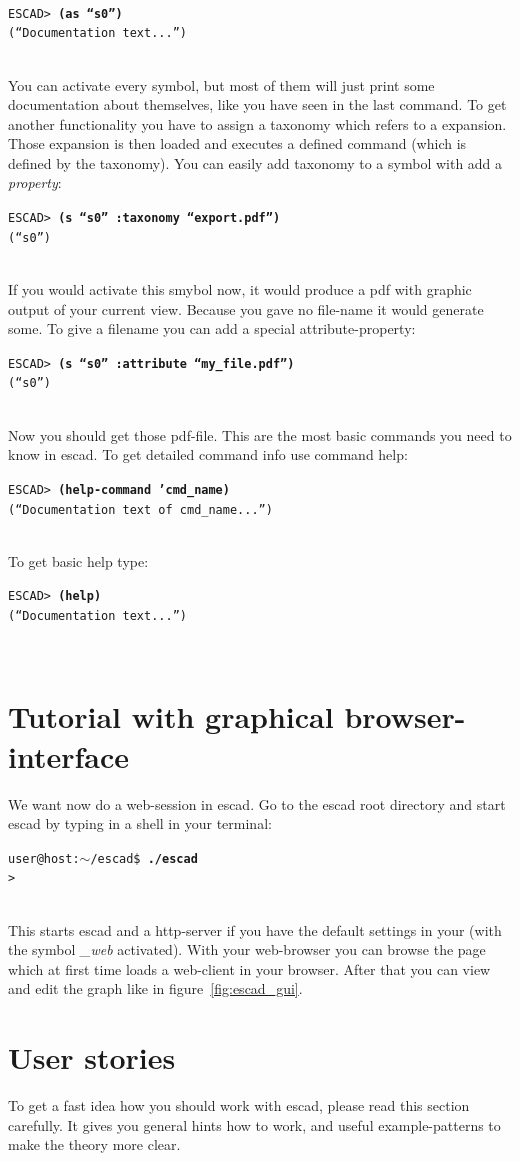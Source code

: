 \documentclass[a4paper, 12pt, openany]{scrbook}
\makeatletter
\newcommand{\shellcmdline}[2]{\\
  \setlength{\fboxsep}{2pt}\colorbox{black!20}{\parbox{\textwidth}{\texttt{user@host:$\sim$/escad\$ \textbf{#1}\\#2}}}\\}
\newcommand{\escadcmdline}[2]{\\\setlength{\fboxsep}{2pt}\colorbox{black!20}{\parbox{\textwidth}{\texttt{ESCAD> \textbf{#1}\\#2}}}\\}
\makeatother
\begin{document}
\escadcmdline{(as ``s0'')}{(``Documentation text...'')}
You can activate every symbol, but most of them will just print some documentation about themselves, like you have seen in the last command. To get another functionality you have to assign a taxonomy which refers to a expansion. Those expansion is then loaded and executes a defined command (which is defined by the taxonomy).
You can easily add taxonomy to a symbol with add a \emph{property}:
\escadcmdline{(s ``s0'' :taxonomy ``export.pdf'')}{(``s0'')}
If you would activate this smybol now, it would produce a pdf with graphic output of your current view. Because you gave no file-name it would generate some. To give a filename you can add a special attribute-property:
\escadcmdline{(s ``s0'' :attribute ``my\_file.pdf'')}{(``s0'')}
Now you should get those pdf-file.
This are the most basic commands you need to know in escad. To get detailed command info use command help:
\escadcmdline{(help-command 'cmd\_name)}{(``Documentation text of cmd\_name...'')}
To get basic help type:
\escadcmdline{(help)}{(``Documentation text...'')}
\section{Tutorial with graphical browser-interface}
We want now do a web-session in escad. Go to the escad root directory and start escad by typing in a shell in your terminal:
\shellcmdline{./escad}{>}
This starts escad and a http-server if you have the default settings in your  (with the symbol \emph{\_web} activated). With your web-browser you can browse the page which at first time loads a web-client in your browser. After that you can view and edit the graph like in figure~\ref{fig:escad_gui}.
\section{User stories}
To get a fast idea how you should work with escad, please read this section carefully. It gives you general hints how to work, and useful example-patterns to make the theory more clear.
\end{document}
